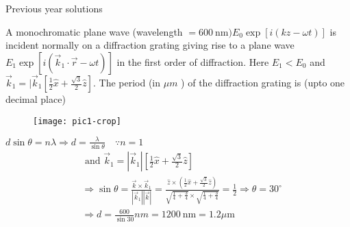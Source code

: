 \newpage
\begin{abox}
	Previous year solutions
	\end{abox}
\begin{enumerate}
\begin{minipage}{\textwidth}
	\item A monochromatic plane wave (wavelength $=600 \mathrm{~nm}) E_{0} \exp [i(k z-\omega t)]$ is incident normally on a diffraction grating giving rise to a plane wave $E_{1} \exp \left[i\left(\vec{k}_{1} \cdot \vec{r}-\omega t\right)\right]$ in the first order of diffraction. Here $E_{1}<E_{0}$ and $\vec{k}_{1}=\mid \vec{k}_{1}\left[\frac{1}{2} \hat{x}+\frac{\sqrt{3}}{2} \hat{z}\right] .$ The period (in $\mu m$ ) of the diffraction grating is (upto one decimal place)
\end{minipage}
\begin{answer}
	\begin{figure}[H]
		\centering
		\texttt{[image: pic1-crop]}
	\end{figure}
 $d \sin \theta=n \lambda \Rightarrow d=\frac{\lambda}{\sin \theta} \quad \because n=1$
	$$
	\begin{aligned}
	&\text { and } \vec{k}_{1}=\left|\vec{k}_{1}\right|\left[\frac{1}{2} \hat{x}+\frac{\sqrt{3}}{2} \hat{z}\right] \\
	&\Rightarrow \sin \theta=\frac{\vec{k} \times \vec{k}_{1}}{\left|\vec{k}_{1}\right||\vec{k}|}=\frac{\hat{z} \times\left(\frac{1}{2} \hat{x}+\frac{\sqrt{3}}{2} \hat{z}\right)}{\sqrt{\frac{1}{4}+\frac{3}{4}} \times \sqrt{\frac{1}{4}+\frac{3}{4}}}=\frac{1}{2} \Rightarrow \theta=30^{\circ} \\
	&\Rightarrow d=\frac{600}{\sin 30} n m=1200 \mathrm{~nm}=1.2 \mu \mathrm{m}
	\end{aligned}
	$$
\end{answer}
\end{enumerate}